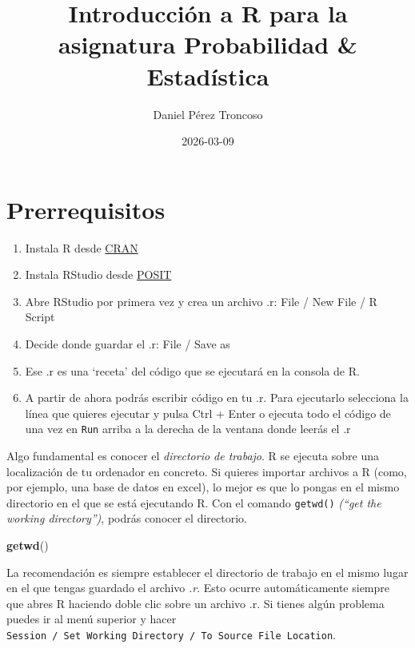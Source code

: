 \documentclass[
]{book}
\title{Introducción a R para la asignatura Probabilidad \& Estadística}
\author{Daniel Pérez Troncoso}
\date{2026-03-09}
\newenvironment{Shaded}{\begin{snugshade}}{\end{snugshade}}
\newcommand{\FunctionTok}[1]{\textcolor[rgb]{0.13,0.29,0.53}{\textbf{#1}}}
\newcommand{\NormalTok}[1]{#1}
\providecommand{\tightlist}{%
  \setlength{\itemsep}{0pt}\setlength{\parskip}{0pt}}
\begin{document}
\maketitle

{
\setcounter{tocdepth}{1}
\tableofcontents
}
\chapter{Prerrequisitos}\label{prerrequisitos}

\begin{enumerate}
\def\labelenumi{\arabic{enumi}.}
\tightlist
\item
  Instala R desde \href{https://cran.r-project.org/}{CRAN}
\item
  Instala RStudio desde \href{https://posit.co/download/rstudio-desktop/}{POSIT}
\item
  Abre RStudio por primera vez y crea un archivo .r: File / New File / R Script
\item
  Decide donde guardar el .r: File / Save as
\item
  Ese .r es una `receta' del código que se ejecutará en la consola de R.
\item
  A partir de ahora podrás escribir código en tu .r. Para ejecutarlo selecciona la línea que quieres ejecutar y pulsa Ctrl + Enter o ejecuta todo el código de una vez en \texttt{Run} arriba a la derecha de la ventana donde leerás el .r
\end{enumerate}

Algo fundamental es conocer el \emph{directorio de trabajo}. R se ejecuta sobre una localización de tu ordenador en concreto. Si quieres importar archivos a R (como, por ejemplo, una base de datos en excel), lo mejor es que lo pongas en el mismo directorio en el que se está ejecutando R. Con el comando \texttt{getwd()} \emph{(``get the working directory'')}, podrás conocer el directorio.

\begin{Shaded}
\begin{Highlighting}[]
\FunctionTok{getwd}\NormalTok{()}
\end{Highlighting}
\end{Shaded}

La recomendación es siempre establecer el directorio de trabajo en el mismo lugar en el que tengas guardado el archivo \emph{.r}. Esto ocurre automáticamente siempre que abres R haciendo doble clic sobre un archivo .r. Si tienes algún problema puedes ir al menú superior y hacer \texttt{Session\ /\ Set\ Working\ Directory\ /\ To\ Source\ File\ Location}.
\end{document}
